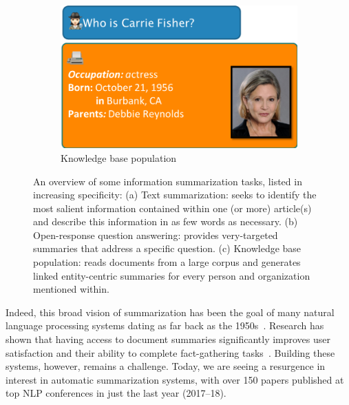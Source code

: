 \begin{figure}[!p]
  \begin{subfigure}[b]{.42\textwidth}
    \includegraphics[width=\textwidth]{figures/task_kbp}
    \caption{Knowledge base population}
  \end{subfigure}

  \caption[Overview of some information summarization tasks]{\label{fig:intro:overview} An overview of some information summarization tasks, listed in increasing specificity:
  (a) Text summarization: seeks to identify the most salient information contained within one (or more) article(s) and describe this information in as few words as necessary.
  (b) Open-response question answering: provides very-targeted summaries that address a specific question.
  (c) Knowledge base population: reads documents from a large corpus and generates linked entity-centric summaries for every person and organization mentioned within.
  }
\end{figure}

Indeed, this broad vision of summarization  has been the goal of many natural language processing systems dating as far back as the 1950s~\citep{luhn1958automatic}.
Research has shown that having access to document summaries significantly improves user satisfaction and their ability to complete fact-gathering tasks~\citep{mani1999tipster, mckeown2005summaries}. 
Building these systems, however, remains a challenge.
Today, we are seeing a resurgence in interest in automatic summarization systems, with over 150 papers published at top NLP conferences in just the last year (2017--18).

